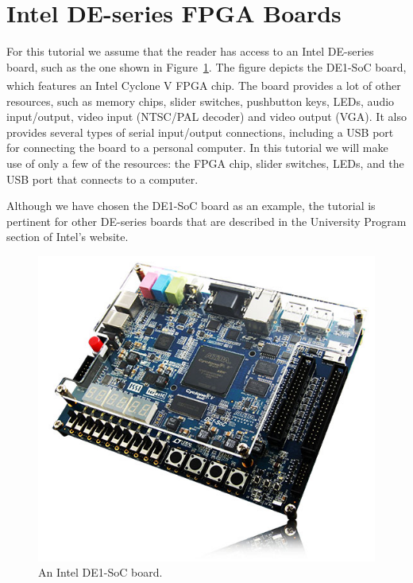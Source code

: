 \documentclass[11pt, twoside, pdftex]{article}
\begin{document}
\section{Intel DE-series FPGA Boards}
For this tutorial we assume that the reader has access to an Intel DE-series board,
such as the one shown in Figure~\ref{fig:1}. The figure depicts the DE1-SoC board, which features an Intel 
Cyclone\textsuperscript{\textregistered} V FPGA chip. The board provides a lot of other resources, such as memory chips, slider switches,
pushbutton keys, LEDs, audio input/output, video input (NTSC/PAL decoder) and video output (VGA).
It also provides several types of serial input/output connections, including a USB port for
connecting the board to a personal computer. In this tutorial we will make use of only a few of 
the resources: the FPGA chip, slider switches, LEDs, and the USB port that connects to a computer.

Although we have chosen the DE1-SoC board as an example, the tutorial is pertinent for other
DE-series boards that are described in the University Program section of Intel's website. 

\begin{figure}[H]
   \begin{center}
      \includegraphics[scale=.5]{figures/figure1.png}
   \end{center}
   \caption{An Intel DE1-SoC board.} 
	\label{fig:1}
\end{figure}
\end{document}
